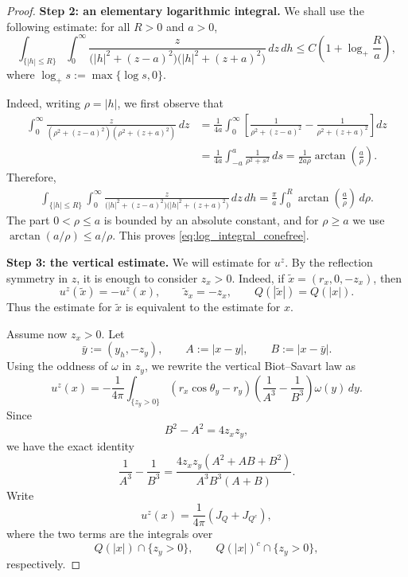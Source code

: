 \documentclass[reqno,11pt]{amsart}
\begin{document}
\begin{proof}
\medskip
\noindent\textbf{Step 2: an elementary logarithmic integral.}
We shall use the following estimate: for all \(R>0\) and \(a>0\),
\begin{equation}
\label{eq:log_integral_conefree}
    \int_{\{|h|\le R\}}\int_0^\infty
    \frac{z}
    {\big(|h|^2+(z-a)^2\big)\big(|h|^2+(z+a)^2\big)}
    \,dz\,dh
    \le
    C\left(1+\log_+\frac{R}{a}\right),
\end{equation}
where \(\log_+s:=\max\{\log s,0\}\).

Indeed, writing \(\rho=|h|\), we first observe that
\[
\begin{aligned}
    \int_0^\infty
    \frac{z}
    {(\rho^2+(z-a)^2)(\rho^2+(z+a)^2)}
    \,dz
    &=
    \frac{1}{4a}
    \int_0^\infty
    \left[
    \frac{1}{\rho^2+(z-a)^2}
    -
    \frac{1}{\rho^2+(z+a)^2}
    \right]dz
    \\
    &=
    \frac{1}{4a}
    \int_{-a}^{a}\frac{1}{\rho^2+s^2}\,ds
    =
    \frac{1}{2a\rho}\arctan\left(\frac{a}{\rho}\right).
\end{aligned}
\]
 Therefore,
\[
\begin{aligned}
    \int_{\{|h|\le R\}}\int_0^\infty
    \frac{z}
    {\big(|h|^2+(z-a)^2\big)\big(|h|^2+(z+a)^2\big)}
    \,dz\,dh
    =
    \frac{\pi}{a}\int_0^R
    \arctan\left(\frac{a}{\rho}\right)\,d\rho .
\end{aligned}
\]
The part \(0< \rho\le a\) is bounded by an absolute constant, and for
\(\rho\ge a\) we use \(\arctan(a/\rho)\le a/\rho\). This proves
\eqref{eq:log_integral_conefree}.

\medskip
\noindent\textbf{Step 3: the vertical estimate.}
We will estimate for \(u^z\). By the reflection symmetry in \(z\), it is
enough to consider \(z_x>0\). Indeed, if \(\widetilde x=(r_x,0,-z_x)\), then
\[
    u^z(\widetilde x)=-u^z(x),
    \qquad
    \widetilde z_x=-z_x,
    \qquad
    Q(|\widetilde x|)=Q(|x|).
\]
Thus the estimate for \(\widetilde x\) is equivalent to the estimate for \(x\).

Assume now \(z_x>0\). Let
\[
    \bar y:=(y_h,-z_y),
    \qquad
    A:=|x-y|,
    \qquad
    B:=|x-\bar y|.
\]
Using the oddness of \(\omega\) in \(z_y\), we rewrite the vertical Biot--Savart law as
\[
    u^z(x)
    =
    -
    \frac{1}{4\pi}
    \int_{\{z_y>0\}}
    (r_x\cos\theta_y-r_y)
    \left(\frac1{A^3}-\frac1{B^3}\right)
\omega(y)\,dy.
\]
Since
\[
    B^2-A^2=4z_xz_y,
\]
we have the exact identity
\begin{equation}
\label{eq:diff_kernel_vertical_conefree}
    \frac1{A^3}-\frac1{B^3}
    =
    \frac{4z_xz_y(A^2+AB+B^2)}{A^3B^3(A+B)}.
\end{equation}
Write
\[
    u^z(x)=\frac{1}{4\pi}(J_{Q}+J_{Q^c}),
\]
where the two terms are the integrals over
\[
    Q(|x|)\cap\{z_y>0\},
    \qquad
    Q(|x|)^c\cap\{z_y>0\},
\]
respectively.


\end{proof}
\end{document}
